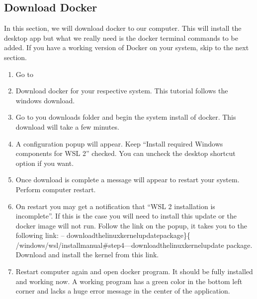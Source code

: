 \documentclass[letterpaper,10pt,english]{sphinxmanual}
\begin{document}
\subsection{Download Docker}
\label{\detokenize{pages/gettingStarted/docker:download-docker}}
\sphinxAtStartPar
In this section, we will download docker to our computer.
This will install the desktop app but what we really need is the docker
terminal commands to be added.
If you have a working version of Docker on your system,
skip to the next section.
\begin{enumerate}
%
\item {} 
\sphinxAtStartPar
Go to 

\item {} 
\sphinxAtStartPar
Download docker for your respective system.
This tutorial follows the windows download.

\noindent{}

\item {} 
\sphinxAtStartPar
Go to you downloads folder and begin the system install of docker.
This download will take a few minutes.

\item {} 
\sphinxAtStartPar
A configuration popup will appear. Keep “Install required Windows components
for WSL 2” checked.  You can uncheck the desktop shortcut option if you want.

\noindent{}

\item {} 
\sphinxAtStartPar
Once download is complete a message will appear to restart your system.
Perform computer restart.

\item {} 
\sphinxAtStartPar
On restart you may get a notification that “WSL 2 installation is
incomplete”. If this is the case you will need to install this update or
the docker image will not run. Follow the link on the popup, it takes you
to the following link:
–
\sphinxhyphen{}download\sphinxhyphen{}the\sphinxhyphen{}linux\sphinxhyphen{}kernel\sphinxhyphen{}update\sphinxhyphen{}package\}\{
/windows/wsl/install\sphinxhyphen{}manual\#step\sphinxhyphen{}4—download\sphinxhyphen{}the\sphinxhyphen{}linux\sphinxhyphen{}kernel\sphinxhyphen{}update\sphinxhyphen{}
package. Download and install the kernel from this link.

\noindent{}

\item {} 
\sphinxAtStartPar
Restart computer again and open docker program.
It should be fully installed and working now.
A working program has a green color in the bottom left corner and lacks a
huge error message in the center of the application.

\noindent{}

\end{enumerate}
\end{document}

